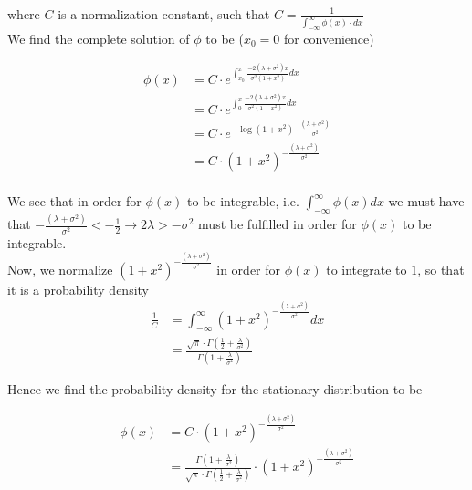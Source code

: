 \documentclass[a4paper,12pt]{article}
\begin{document}
where $C$ is a normalization constant, such that $C=\frac{1}{\int_{-\infty}^{\infty} \phi(x)\cdot dx}$\\

We find the complete solution of $\phi$ to be ($x_0=0$ for convenience)


\begin{equation*}
\begin{aligned}
\phi(x)&=C\cdot e^{\int_{x_0}^x \frac{-2(\lambda+\sigma^2)x}{\sigma^2(1+x^2)} dx}\\
&=C\cdot e^{\int_{0}^x \frac{-2(\lambda+\sigma^2)x}{\sigma^2(1+x^2)}dx}\\
&=C\cdot e^{-\log(1+x^2)\cdot \frac{(\lambda+\sigma^2)}{\sigma^2}}\\
&=C\cdot (1+x^2)^{-\frac{(\lambda+\sigma^2)}{\sigma^2}}\\
\end{aligned}
\end{equation*}

We see that in order for $\phi(x)$ to be integrable, i.e. $\int_{-\infty}^{\infty} \phi(x) dx$ we must have that $-\frac{(\lambda+\sigma^2)}{\sigma^2}<-\frac{1}{2} \rightarrow 2\lambda>-\sigma^2$ must be fulfilled in order for $\phi(x)$ to be integrable.\\

Now, we normalize $(1+x^2)^{-\frac{(\lambda+\sigma^2)}{\sigma^2}}$ in order for $\phi(x)$ to integrate to $1$, so that it is a probability density\\


\begin{equation*}
\begin{aligned}
\frac{1}{C}&=\int_{-\infty}^{\infty} (1+x^2)^{-\frac{(\lambda+\sigma^2)}{\sigma^2}} dx\\
&=\frac{\sqrt{\pi}\cdot\Gamma(\frac{1}{2}+\frac{\lambda}{\sigma^2})}{\Gamma(1+\frac{\lambda}{\sigma^2})}
\end{aligned}
\end{equation*}

Hence we find the probability density for the stationary distribution to be



\begin{equation*}
\begin{aligned}
\phi(x)&=C\cdot (1+x^2)^{-\frac{(\lambda+\sigma^2)}{\sigma^2}}\\
&=\frac{\Gamma(1+\frac{\lambda}{\sigma^2})}{\sqrt{\pi}\cdot\Gamma(\frac{1}{2}+\frac{\lambda}{\sigma^2})}\cdot (1+x^2)^{-\frac{(\lambda+\sigma^2)}{\sigma^2}}
\end{aligned}
\end{equation*}
\end{document}
